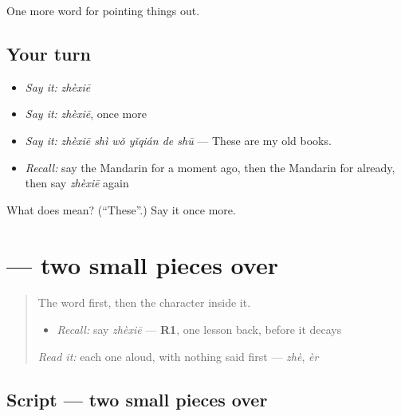 \begin{grammarlens}[title={What you've built}]
One more word for pointing things out.
\end{grammarlens}

\subsection*{Your turn}
\begin{itemize}
\raggedright
  \item \emph{Say it:} \emph{zhèxiē}
  \item \emph{Say it:} \emph{zhèxiē}, once more
  \item \emph{Say it:} \emph{zhèxiē shì wǒ yǐqián de shū} — These are my old books.
  \item \emph{Recall:} say the Mandarin for a moment ago, then the Mandarin for already, then say \emph{zhèxiē} again
\end{itemize}

\begin{tcolorbox}[breakable,colback=teal!4,colframe=teal!35!black,title={Before you move on}]
What does  mean? (\textquotedblleft{}These\textquotedblright{}.) Say it once more.
\end{tcolorbox}
\section[\texorpdfstring{\zh{些} (xiē)}{些 (xiē)}]{ — two small pieces over }

\label{lesson:ZH-W127-xie-few}



\begin{quote}
The word first, then the character inside it.

\begin{itemize}
\raggedright
  \item \emph{Recall:} say \emph{zhèxiē} — \textbf{R1}, one lesson back, before it decays
\end{itemize}

\begin{quote}
 
\end{quote}

\emph{Read it:} each one aloud, with nothing said first — \emph{zhè}, \emph{èr}
\end{quote}

\subsection*{Script — two small pieces over }


